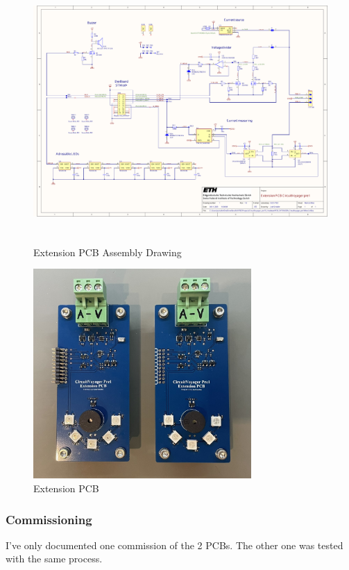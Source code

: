 \begin{figure}[H]
	\centering
	\includegraphics[height=10cm, page=2]{../../../5_Hardware/PCB_EXTENSION_CircuitVoyager_pre1/Project Outputs for PCB_EXT_CV_PRE1/PCB_EXTENSION_CircuitVoyager_pre1.pdf}
	\caption{Extension PCB Assembly Drawing}
	\label{fig:Extension PCB Assembly Drawing}
\end{figure}



\begin{figure}[H]
	\centering
	\includegraphics[height=8cm]{Resources/PCB.png}
	\caption{Extension PCB}
	\label{fig:Extension PCB}
\end{figure}

\newpage
\subsubsection{Commissioning}
I've only documented one commission of the 2 PCBs. The other one was tested with the same process.

